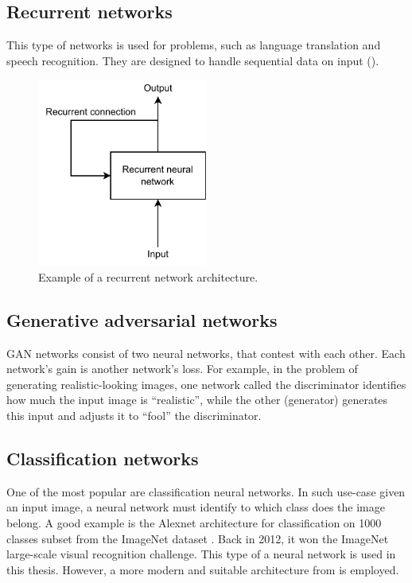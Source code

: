 \subsection{Recurrent networks}

This type of networks is used for problems, such as language translation and speech recognition. They are designed to handle sequential data on input ().

\begin{figure}[!h]
  \centering
  \includegraphics[width=0.5\textwidth]{./fig/photos/recurrent.pdf}

  \caption{Example of a recurrent network architecture.}
  \label{fig:recurrent}
\end{figure}

\subsection{Generative adversarial networks}

GAN networks consist of two neural networks, that contest with each other. Each network's gain is another network's loss. For example, in the problem of generating realistic-looking images, one network called the discriminator identifies how much the input image is \enquote{realistic}, while the other (generator) generates this input and adjusts it to \enquote{fool} the discriminator.

\subsection{Classification networks}

One of the most popular are classification neural networks. In such use-case given an input image, a neural network must identify to which class does the image belong. A good example is the Alexnet architecture for classification on 1000 classes subset from the ImageNet dataset \cite{krizhevsky2012imagenet}. Back in 2012, it won the ImageNet large-scale visual recognition challenge. This type of a neural network is used in this thesis. However, a more modern and suitable architecture from \cite{giusti2016machine} is employed.

